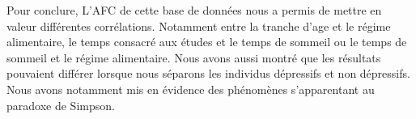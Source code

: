 Pour conclure, L'AFC de cette base de données nous a permis de mettre en valeur différentes corrélations.
Notamment entre la tranche d'age et le régime alimentaire, le temps consacré aux études et le temps de sommeil ou le temps de sommeil et le régime alimentaire.
Nous avons aussi montré que les résultats pouvaient différer lorsque nous séparons les individus dépressifs et non dépressifs. Nous avons notamment mis en évidence des phénomènes s'apparentant au paradoxe de Simpson.
